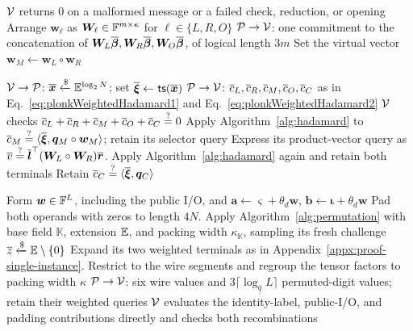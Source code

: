 \begin{algorithm}[!t]
\footnotesize
\caption{PLONK proof with single-instance packing}
\label{alg:single-instance-packing}

\(\mathcal{V}\) returns \(0\) on a malformed message or a failed
check, reduction, or opening\;
Arrange \(\bm w_\ell\) as \(\bm W_\ell\in{\mathbb{F}}^{m\times\kappa}\)
for \(\ell\in\{L,R,O\}\)\;
\({\mathcal{P} \rightarrow \mathcal{V}}\): one commitment to the concatenation of
\(\bm W_L\overline{\bm\beta},\bm W_R\overline{\bm\beta},
\bm W_O\overline{\bm\beta}\), of logical length \(3m\)\;
Set the virtual vector \(\bm w_M\leftarrow\bm w_L\circ\bm w_R\)\;

\({\mathcal{V} \rightarrow \mathcal{P}}\): \(\overline{\bm x}\mathrel{\xleftarrow{\$}}\mathbb{E}^{\log_2N}\);
set \(\overline{\bm\xi}\leftarrow{\sf ts}(\overline{\bm x})\)\;
\({\mathcal{P} \rightarrow \mathcal{V}}\): \(\overline{c}_L,\overline{c}_R,\overline{c}_M,\overline{c}_O,\overline{c}_C\)
as in Eq.~\eqref{eq:plonkWeightedHadamard1} and
Eq.~\eqref{eq:plonkWeightedHadamard2}\;
\(\mathcal{V}\) checks
\(\overline{c}_L+\overline{c}_R+\overline{c}_M+\overline{c}_O+\overline{c}_C\mathrel{\overset{\mathrm{?}}{=}}0\)\;
Apply Algorithm~\ref{alg:hadamard} to
\(\overline{c}_M\mathrel{\overset{\mathrm{?}}{=}}
\langle\overline{\bm\xi},\bm q_M\circ\bm w_M\rangle\);
retain its selector query\;
Express its product-vector query as
\(\overline{v}\mathrel{\overset{\mathrm{?}}{=}}
\overline{\bm l}^{\top}(\bm W_L\circ\bm W_R)\overline{\bm r}\).
Apply Algorithm~\ref{alg:hadamard} again and retain both terminals\;
Retain \(\overline{c}_C\mathrel{\overset{\mathrm{?}}{=}}\langle\overline{\bm\xi},\bm q_C\rangle\)\;

Form \(\bm w\in{\mathbb{F}}^L\), including the public I/O, and
\(\bm a\leftarrow\bm\varsigma+\theta_d\bm w\),
\(\bm b\leftarrow\bm\iota+\theta_d\bm w\)\;
Pad both operands with zeros to length \(4N\).
Apply Algorithm~\ref{alg:permutation} with base field \(\mathbb K\),
extension \(\mathbb{E}\), and packing width \(\kappa_{\mathbb K}\),
sampling its fresh challenge
\(\overline{z}\mathrel{\xleftarrow{\$}}\mathbb{E}\setminus\{0\}\)\;
Expand its two weighted terminals as in
Appendix~\ref{appx:proof-single-instance}.
Restrict to the wire segments and regroup the tensor factors
to packing width \(\kappa\)\;
\({\mathcal{P} \rightarrow \mathcal{V}}\): six wire values and
\(3\lceil\log_{\underline q}L\rceil\) permuted-digit values;
retain their weighted queries\;
\(\mathcal{V}\) evaluates the identity-label, public-I/O, and padding
contributions directly and checks both recombinations\;


\end{algorithm}
